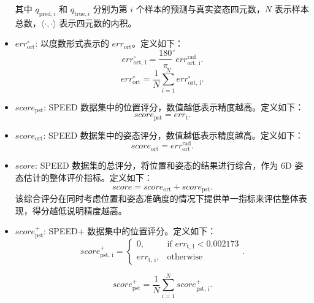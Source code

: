 \begin{itemize}
	其中 $q_{\text{pred},i}$ 和 $q_{\text{true},i}$ 分别为第 $i$ 个样本的预测与真实姿态四元数，$N$ 表示样本总数，$\langle \cdot, \cdot \rangle$ 表示四元数的内积。
	
	\item $err_{\text{ort}}^{\circ}$: 以度数形式表示的 $err_{\text{ort}}$。定义如下：
	\begin{equation}
		err_{\text{ort, i}}^{\circ} =  \frac{180}{\pi}^{\circ} err_{\text{ort, i}}^{\text{rad}}.
	\end{equation}
	\begin{equation}
		err_{\text{ort}}^{\circ} = \frac{1}{N}\sum\limits_{i=1}^N err_{\text{ort, i}}^{\circ}. 
	\end{equation}
	
	\item $score_{\text{pst}}$: SPEED 数据集中的位置评分，数值越低表示精度越高。定义如下：
	\begin{equation}
		score_{\text{pst}} = err_{\text{t}}.
	\end{equation}
	
	\item $score_{\text{ort}}$: SPEED 数据集中的姿态评分，数值越低表示精度越高。定义如下：
	\begin{equation}
		score_{\text{ort}} = err_{\text{ort}}^{\text{rad}}.
	\end{equation}
	
	\item $score$: SPEED 数据集的总评分，将位置和姿态的结果进行综合，作为 6D 姿态估计的整体评价指标。定义如下：
	\begin{equation}
		score = score_{\text{ort}} + score_{\text{pst}}.
	\end{equation}
	该综合评分在同时考虑位置和姿态准确度的情况下提供单一指标来评估整体表现，得分越低说明精度越高。
	
	\item $score_{\text{pst}}^+$: SPEED+ 数据集中的位置评分。定义如下：
	\begin{equation}
		score_{\text{pst, i}}^+ = 
		\begin{cases}
			0, & \text{if } err_{\text{t, i}} < 0.002173 \\
			err_{\text{t, i}}, & \text{otherwise}
		\end{cases}.
	\end{equation}
	
	\begin{equation}
		score_{\text{pst}}^+ = \frac{1}{N}\sum\limits_{i=1}^N score_{\text{pst, i}}^+.
	\end{equation}
	

\end{itemize}
